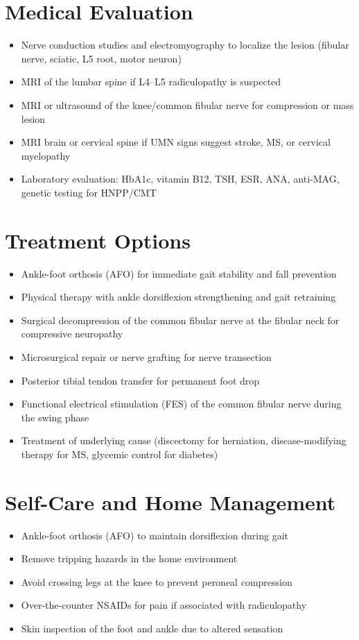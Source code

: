 \section*{Medical Evaluation}
\begin{itemize}
  \item Nerve conduction studies and electromyography to localize the lesion (fibular nerve, sciatic, L5 root, motor neuron)
  \item MRI of the lumbar spine if L4--L5 radiculopathy is suspected
  \item MRI or ultrasound of the knee/common fibular nerve for compression or mass lesion
  \item MRI brain or cervical spine if UMN signs suggest stroke, MS, or cervical myelopathy
  \item Laboratory evaluation: HbA1c, vitamin B12, TSH, ESR, ANA, anti-MAG, genetic testing for HNPP/CMT
\end{itemize}

\section*{Treatment Options}
\begin{itemize}
  \item Ankle-foot orthosis (AFO) for immediate gait stability and fall prevention
  \item Physical therapy with ankle dorsiflexion strengthening and gait retraining
  \item Surgical decompression of the common fibular nerve at the fibular neck for compressive neuropathy
  \item Microsurgical repair or nerve grafting for nerve transection
  \item Posterior tibial tendon transfer for permanent foot drop
  \item Functional electrical stimulation (FES) of the common fibular nerve during the swing phase
  \item Treatment of underlying cause (discectomy for herniation, disease-modifying therapy for MS, glycemic control for diabetes)
\end{itemize}

\section*{Self-Care and Home Management}
\begin{itemize}
  \item Ankle-foot orthosis (AFO) to maintain dorsiflexion during gait
  \item Remove tripping hazards in the home environment
  \item Avoid crossing legs at the knee to prevent peroneal compression
  \item Over-the-counter NSAIDs for pain if associated with radiculopathy
  \item Skin inspection of the foot and ankle due to altered sensation
\end{itemize}

